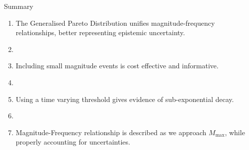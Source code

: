\begin{frame}{Summary}
    \begin{enumerate}
        \item The Generalised Pareto Distribution unifies magnitude-frequency relationships, better representing epistemic uncertainty.
        \item []
        \item Including small magnitude events is cost effective and informative. 
        \item []
        \item Using a time varying threshold gives evidence of sub-exponential decay. 
        \item []
        \item Magnitude-Frequency relationship is described as we approach $M_{\text{max}}$, while properly accounting for uncertainties.
    \end{enumerate}
\end{frame}

